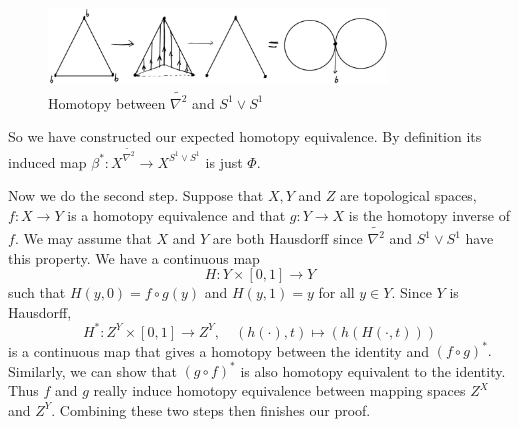\documentclass{article}
\begin{document}
\begin{figure}[hb]
  \centering
  \includegraphics[width=9cm]{6.3_3}
  \caption{Homotopy between $\widetilde{\nabla^2}$ and $S^1\vee S^1$}\label{hmtp}
\end{figure}

So we have constructed our expected homotopy equivalence. By definition its induced map $\beta^*\colon X^{\widetilde{\nabla^2}}\rightarrow X^{S^1\vee S^1}$ is just $\Phi.$

Now we do the second step. Suppose that $X,Y$ and $Z$ are topological spaces,  $f\colon X\rightarrow Y$ is a homotopy equivalence and that $g\colon Y\rightarrow X$ is the homotopy inverse of $f$. We may assume that $X$ and $Y$ are both Hausdorff since $\widetilde{\nabla^2}$ and $S^1\vee S^1$ have this property. We have a continuous map
\[H\colon Y\times[0,1]\rightarrow Y\]
such that $H(y,0)=f\circ g(y)$ and $H(y,1)=y$ for all $y\in Y.$ Since $Y$ is Hausdorff,
\[H^*\colon Z^Y\times[0,1]\rightarrow Z^Y,\quad (h(\cdot),t)\mapsto (h(H(\cdot,t)))\]
is a continuous map that gives a homotopy between the identity and $(f\circ g)^*.$ Similarly, we can show that $(g\circ f)^*$ is also homotopy equivalent to the identity. Thus $f$ and $g$ really induce homotopy equivalence between mapping spaces $Z^X$ and $Z^Y.$ Combining these two steps then finishes our proof.
\end{document}
